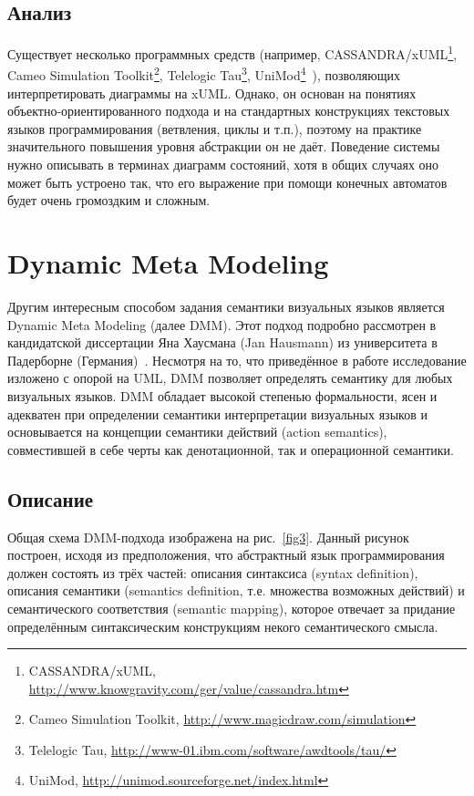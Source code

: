 \documentclass[a5paper]{article}
\begin{document}
\subsection{Анализ}

Существует несколько программных средств (например, CASSANDRA/xUML\footnote{CASSANDRA/xUML, \url{http://www.knowgravity.com/ger/value/cassandra.htm}}, Cameo Simulation Toolkit\footnote{Cameo Simulation Toolkit, \url{http://www.magicdraw.com/simulation}}, Telelogic Tau\footnote{Telelogic Tau, \url{http://www-01.ibm.com/software/awdtools/tau/}}, UniMod\footnote{UniMod, \url{http://unimod.sourceforge.net/index.html}}~\cite{unimod}), позволяющих интерпретировать диаграммы на xUML. Однако, он основан на понятиях объектно-ориентированного подхода и на стандартных конструкциях текстовых языков программирования (ветвления, циклы и т.п.), поэтому на практике значительного повышения уровня абстракции он не даёт. Поведение системы нужно описывать в терминах диаграмм состояний, хотя в общих случаях оно может быть устроено так, что его выражение при помощи конечных автоматов будет очень громоздким и сложным.

\section{Dynamic Meta Modeling}

Другим интересным способом задания семантики визуальных языков является Dynamic Meta Modeling (далее DMM). Этот подход подробно рассмотрен в кандидатской диссертации Яна Хаусмана (Jan Hausmann) из университета в Падерборне (Германия)~\cite{dmm2}. Несмотря на то, что приведённое в работе исследование изложено с опорой на UML, DMM позволяет определять семантику для любых визуальных языков. DMM обладает высокой степенью формальности, ясен и адекватен при определении семантики интерпретации визуальных языков и основывается на концепции семантики действий (action semantics), совместившей в себе черты как денотационной, так и операционной семантики.

\subsection{Описание}

Общая схема DMM-подхода изображена на рис.~\ref{fig3}. Данный рисунок построен, исходя из предположения, что абстрактный язык программирования должен состоять из трёх частей: описания синтаксиса (syntax definition), описания семантики (semantics definition, т.е. множества возможных действий) и семантического соответствия (semantic mapping), которое отвечает за придание определённым синтаксическим конструкциям некого семантического смысла.
\end{document}
